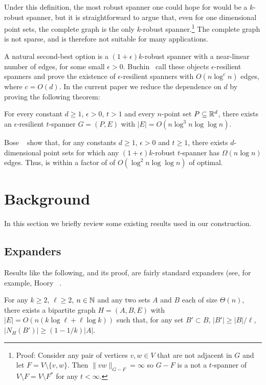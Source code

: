 \documentclass{patmorin}
\begin{document}
Under this definition, the most robust spanner one could hope for
would be a $k$-robust spanner, but it is straightforward to argue
that, even for one dimensional point sets, the complete graph is the
only $k$-robust spanner.\footnote{Proof: Consider any pair of vertices
$v,w\in V$ that are not adjacent in $G$ and let $F=V\setminus\{v,w\}$.
Then $\|vw\|_{G-F}=\infty$ so $G-F$ is a not a $t$-spanner of $V\setminus
F=V\setminus F^*$ for any $t<\infty$.} The complete graph is not sparse,
and is therefore not suitable for many applications. 

A natural second-best option is a $(1+\epsilon)k$-robust spanner with
a near-linear number of edges, for some small $\epsilon >0$.  Buchin
\etal\ call these objects $\epsilon$-resilient spanners and prove the
existence of $\epsilon$-resilient spanners with $O(n\log^c n)$ edges,
where $c=O(d)$.  In the current paper we reduce the dependence on $d$
by proving the following theorem:

\begin{thm}
  For every constant $d\ge 1$, $\epsilon>0$, $t>1$ and every $n$-point set $P\subseteq\mathbb{R}^d$, there exists an $\epsilon$-resilient $t$-spanner $G=(P,E)$ with $|E|=O(n\log^3 n\log\log n)$.
\end{thm}

Bose \etal\ \cite{bose.dujmovic.ea:robust} show that, for any constants
$d\ge 1$, $\epsilon>0$ and $t\ge 1$, there exists $d$-dimensional point
sets for which any $(1+\epsilon)k$-robust $t$-spanner has $\Omega(n\log
n)$ edges.  Thus,  is within a factor of of $O(\log^2
n\log\log n)$ of optimal.


\section{Background}

In this section we briefly review some existing results used in
our construction.

\subsection{Expanders}

Results like the following, and its proof, are fairly standard expanders (see, for example, Hoory \etal\ \cite{hoory.linial.ea:expanders}.


\begin{lem}
   For any $k\ge 2$, $\ell\ge 2$, $n\in\mathbb{N}$ and any two sets $A$ and $B$
   each of size $\Theta(n)$, there exists a bipartite graph $H=(A,B,E)$
   with $|E|=O(n(k\log \ell + \ell\log k))$ such that, for any set $B'\subset B$, $|B'|\ge |B|/\ell$, $|N_H(B')| \ge (1-1/k)|A|$.
\end{lem}
\end{document}
